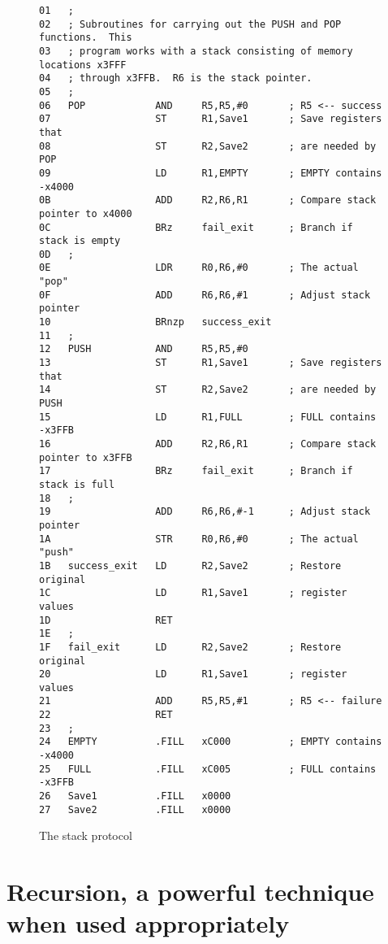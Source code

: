 \documentclass{patt}
\begin{document}
\begin{figure}[h]
\begin{minipage}{36pc}
\begin{Verbatim}[fontsize=\fontsize{9}{11}\selectfont]
01   ;
02   ; Subroutines for carrying out the PUSH and POP functions.  This
03   ; program works with a stack consisting of memory locations x3FFF
04   ; through x3FFB.  R6 is the stack pointer.
05   ;
06   POP            AND     R5,R5,#0       ; R5 <-- success
07                  ST      R1,Save1       ; Save registers that
08                  ST      R2,Save2       ; are needed by POP
09                  LD      R1,EMPTY       ; EMPTY contains -x4000
0B                  ADD     R2,R6,R1       ; Compare stack pointer to x4000
0C                  BRz     fail_exit      ; Branch if stack is empty
0D   ;
0E                  LDR     R0,R6,#0       ; The actual "pop"
0F                  ADD     R6,R6,#1       ; Adjust stack pointer
10                  BRnzp   success_exit
11   ;
12   PUSH           AND     R5,R5,#0
13                  ST      R1,Save1       ; Save registers that
14                  ST      R2,Save2       ; are needed by PUSH
15                  LD      R1,FULL        ; FULL contains -x3FFB
16                  ADD     R2,R6,R1       ; Compare stack pointer to x3FFB
17                  BRz     fail_exit      ; Branch if stack is full
18   ;
19                  ADD     R6,R6,#-1      ; Adjust stack pointer
1A                  STR     R0,R6,#0       ; The actual "push"
1B   success_exit   LD      R2,Save2       ; Restore original
1C                  LD      R1,Save1       ; register values
1D                  RET
1E   ;
1F   fail_exit      LD      R2,Save2       ; Restore original
20                  LD      R1,Save1       ; register values
21                  ADD     R5,R5,#1       ; R5 <-- failure
22                  RET
23   ;
24   EMPTY          .FILL   xC000          ; EMPTY contains -x4000
25   FULL           .FILL   xC005          ; FULL contains  -x3FFB
26   Save1          .FILL   x0000
27   Save2          .FILL   x0000
\end{Verbatim}
\caption{The stack protocol}
\label{fig:stack.protocol}
\end{minipage}
\end{figure}

\FloatBarrier
\section{Recursion, a powerful technique when used appropriately}
\end{document}
